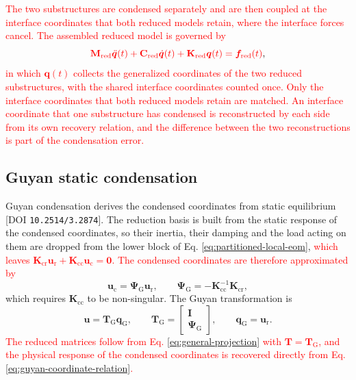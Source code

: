 \documentclass[11pt,a4paper]{article}
\numberwithin{equation}{section}
\newcommand{\rev}[1]{\textcolor{red}{#1}}
\begin{document}
\rev{The two substructures are condensed separately and are then coupled at the interface coordinates that both reduced models retain, where the interface forces cancel. The assembled reduced model is governed by}
\begin{equation}
	\rev{\mathbf{M}_{\mathrm{red}}\ddot{\bm{q}}(t)
		+\mathbf{C}_{\mathrm{red}}\dot{\bm{q}}(t)
		+\mathbf{K}_{\mathrm{red}}\bm{q}(t)
		=\bm{f}_{\mathrm{red}}(t)},
	\label{eq:assembled-reduced}
\end{equation}
\rev{in which \(\bm{q}(t)\) collects the generalized coordinates of the two reduced substructures, with the shared interface coordinates counted once. Only the interface coordinates that both reduced models retain are matched. An interface coordinate that one substructure has condensed is reconstructed by each side from its own recovery relation, and the difference between the two reconstructions is part of the condensation error.}

\subsection{Guyan static condensation} \label{sec21}

Guyan condensation derives the condensed coordinates from static equilibrium \cite{Guyan1965}\,[DOI \nolinkurl{10.2514/3.2874}]. The reduction basis is built from the static response of the condensed coordinates, so their inertia, their damping and the load acting on them are dropped from the lower block of Eq. \eqref{eq:partitioned-local-eom}, \rev{which leaves \(\mathbf{K}_{\mathrm{cr}}\bm{u}_{\mathrm{r}}+\mathbf{K}_{\mathrm{cc}}\bm{u}_{\mathrm{c}}=\bm{0}\). The condensed coordinates are therefore approximated by}
\begin{equation}
	\bm{u}_{\mathrm{c}}=\bm{\Psi}_{\mathrm{G}}\bm{u}_{\mathrm{r}},
	\qquad
	\bm{\Psi}_{\mathrm{G}}=-\mathbf{K}_{\mathrm{cc}}^{-1}\mathbf{K}_{\mathrm{cr}},
	\label{eq:guyan-coordinate-relation}
\end{equation}
which requires \(\mathbf{K}_{\mathrm{cc}}\) to be non-singular.
The Guyan transformation is
\begin{equation}
	\bm{u}=\mathbf{T}_{\mathrm{G}}\bm{q}_{\mathrm{G}},
	\qquad
	\mathbf{T}_{\mathrm{G}}=
	\begin{bmatrix}
		\mathbf{I}\\
		\bm{\Psi}_{\mathrm{G}}
	\end{bmatrix},
	\qquad
	\bm{q}_{\mathrm{G}}=\bm{u}_{\mathrm{r}}.
	\label{eq:guyan-transformation}
\end{equation}
\rev{The reduced matrices follow from Eq. \eqref{eq:general-projection} with \(\mathbf{T}=\mathbf{T}_{\mathrm{G}}\), and the physical response of the condensed coordinates is recovered directly from Eq. \eqref{eq:guyan-coordinate-relation}.}
\end{document}
